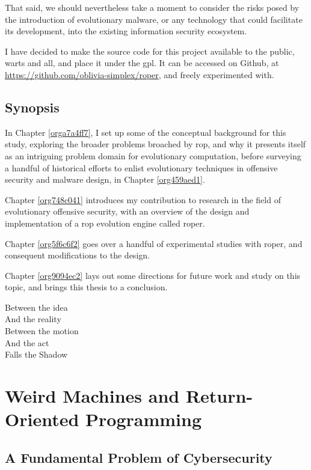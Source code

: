 \documentclass[12pt,glossary]{dalthesis}
\begin{document}
That said, we should nevertheless take a moment to consider the risks posed
by the introduction of evolutionary malware, or any technology that could facilitate
its development, into the existing information security ecosystem.


I have decided to make the source code for this project available to the public,
warts and all, and place it under the \gls{gpl}. It can be accessed on Github,
at \url{https://github.com/oblivia-simplex/roper}, and freely experimented with. 


\section{Synopsis}
\label{sec:org0d1a787}
\label{org9420ff4}

In Chapter \ref{orga7a4ff7}, I set up some of the conceptual
background for this study, exploring the broader problems broached by \gls{rop}, 
and why it presents itself as an intriguing problem domain for evolutionary
computation, before surveying a handful of historical efforts to
enlist evolutionary techniques in offensive security and malware
design, in Chapter \ref{org459aed1}.

Chapter \ref{org748c041} introduces my contribution to research in the field of
evolutionary offensive security, with an overview of the design and implementation of
a \gls{rop} evolution engine called \gls{roper}.

Chapter \ref{org5f6c6f2} goes over a handful of experimental studies with
\gls{roper}, and consequent modifications to the design. 

Chapter \ref{org9094ec2} lays out some directions for future work and study on this
topic, and brings this thesis to a conclusion.



\begin{savequote}
Between the idea\\  
And the reality\\  
Between the motion\\ 
And the act\\
Falls the Shadow
\end{savequote}
\chapter{Weird Machines and Return-Oriented Programming}
\label{sec:org89ba4a5}
\label{orga7a4ff7}
\label{org3cf1da2}
\section{A Fundamental Problem of Cybersecurity}
\label{sec:org9739cb6}
\label{orgcfee7b3}
\end{document}
